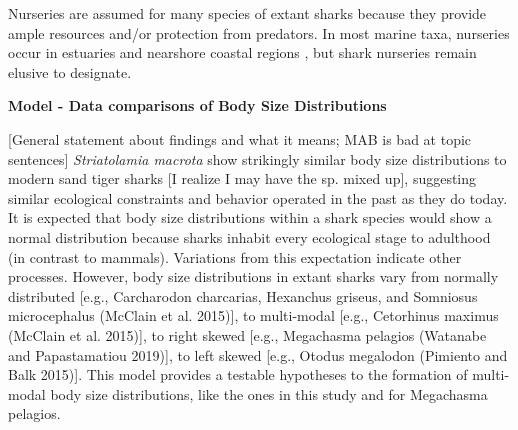 \documentclass[]{rsos}%
\begin{document}
Nurseries are assumed for many species of extant sharks because they provide ample resources  and/or protection from predators. In most marine taxa, nurseries occur in estuaries and nearshore coastal regions \cite{beck2001identification}, but shark nurseries remain elusive to designate.



 \textbf{Model - Data comparisons of Body Size Distributions}
 

[General statement about findings and what it means; MAB is bad at topic sentences]
\emph{Striatolamia macrota} show strikingly similar body size distributions to modern sand tiger sharks [I realize I may have the sp. mixed up], suggesting similar ecological constraints and behavior operated in the past as they do today.
It is expected that body size distributions within a shark species would show a normal distribution because sharks inhabit every ecological stage to adulthood (in contrast to mammals). 
Variations from this expectation indicate other processes.
However, body size distributions in extant sharks vary from normally distributed [e.g., Carcharodon charcarias, Hexanchus griseus, and Somniosus microcephalus (McClain et al. 2015)], to multi-modal [e.g., Cetorhinus maximus (McClain et al. 2015)], to right skewed [e.g., Megachasma pelagios (Watanabe and Papastamatiou 2019)], to left skewed [e.g., Otodus megalodon (Pimiento and Balk 2015)].
This model provides a testable hypotheses to the formation of multi-modal body size distributions, like the ones in this study and for Megachasma pelagios.
\end{document}
